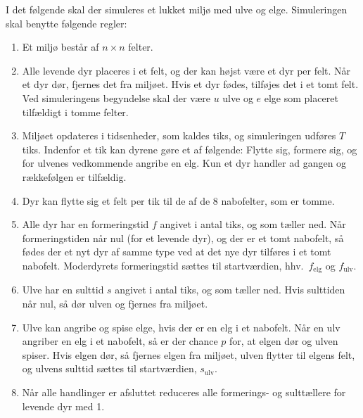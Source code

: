 I det følgende skal der simuleres et lukket miljø med ulve og elge. Simuleringen skal benytte følgende regler:
\begin{enumerate}
\item Et miljø består af $n\times n$ felter.
\item Alle levende dyr placeres i et felt, og der kan højst være et dyr per felt. Når et dyr dør, fjernes det fra miljøet. Hvis et dyr fødes, tilføjes det i et tomt felt. Ved simuleringens begyndelse skal der være $u$ ulve og $e$ elge som placeret tilfældigt i tomme felter.
\item Miljøet opdateres i tidsenheder, som kaldes tiks, og simuleringen udføres $T$ tiks. Indenfor et tik kan dyrene gøre et af følgende: Flytte sig, formere sig, og for ulvenes vedkommende angribe en elg. Kun et dyr handler ad gangen og rækkefølgen er tilfældig.
\item Dyr kan flytte sig et felt per tik til de af de 8 nabofelter, som er tomme.
\item Alle dyr har en formeringstid $f$ angivet i antal tiks, og som tæller ned. Når formeringstiden når nul (for et levende dyr), og der er et tomt nabofelt, så fødes der et nyt dyr af samme type ved at det nye dyr tilføres i et tomt nabofelt. Moderdyrets formeringstid sættes til startværdien, hhv.\ $f_{\text{elg}}$ og $f_{\text{ulv}}$.
\item Ulve har en sulttid $s$ angivet i antal tiks, og som tæller ned. Hvis sulttiden når nul, så dør ulven og fjernes fra miljøet.
\item Ulve kan angribe og spise elge, hvis der er en elg i et nabofelt. Når en ulv angriber en elg i et nabofelt, så er der chance $p$ for, at elgen dør og ulven spiser. Hvis elgen dør, så fjernes elgen fra miljøet, ulven flytter til elgens felt, og ulvens sulttid sættes til startværdien, $s_{\text{ulv}}$.
\item Når alle handlinger er afsluttet reduceres alle formerings- og sulttællere for levende dyr med 1.
\end{enumerate}

